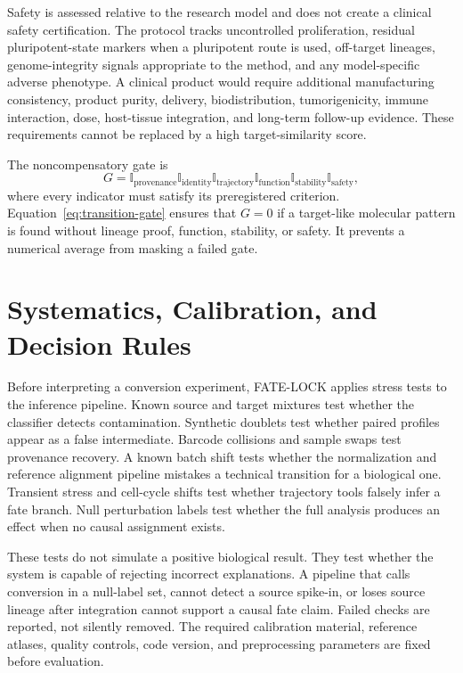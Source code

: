 \documentclass[10pt,conference]{IEEEtran}
\begin{document}
Safety is assessed relative to the research model and does not create a clinical safety certification. The protocol tracks uncontrolled proliferation, residual pluripotent-state markers when a pluripotent route is used, off-target lineages, genome-integrity signals appropriate to the method, and any model-specific adverse phenotype. A clinical product would require additional manufacturing consistency, product purity, delivery, biodistribution, tumorigenicity, immune interaction, dose, host-tissue integration, and long-term follow-up evidence. These requirements cannot be replaced by a high target-similarity score.

The noncompensatory gate is
\begin{equation}
G=\mathbb{I}_{\mathrm{provenance}}\mathbb{I}_{\mathrm{identity}}\mathbb{I}_{\mathrm{trajectory}}\mathbb{I}_{\mathrm{function}}\mathbb{I}_{\mathrm{stability}}\mathbb{I}_{\mathrm{safety}},
\label{eq:transition-gate}
\end{equation}
where every indicator must satisfy its preregistered criterion. Equation~\eqref{eq:transition-gate} ensures that $G=0$ if a target-like molecular pattern is found without lineage proof, function, stability, or safety. It prevents a numerical average from masking a failed gate.

\section{Systematics, Calibration, and Decision Rules}
\label{sec:systematics}

Before interpreting a conversion experiment, FATE-LOCK applies stress tests to the inference pipeline. Known source and target mixtures test whether the classifier detects contamination. Synthetic doublets test whether paired profiles appear as a false intermediate. Barcode collisions and sample swaps test provenance recovery. A known batch shift tests whether the normalization and reference alignment pipeline mistakes a technical transition for a biological one. Transient stress and cell-cycle shifts test whether trajectory tools falsely infer a fate branch. Null perturbation labels test whether the full analysis produces an effect when no causal assignment exists.

These tests do not simulate a positive biological result. They test whether the system is capable of rejecting incorrect explanations. A pipeline that calls conversion in a null-label set, cannot detect a source spike-in, or loses source lineage after integration cannot support a causal fate claim. Failed checks are reported, not silently removed. The required calibration material, reference atlases, quality controls, code version, and preprocessing parameters are fixed before evaluation.
\end{document}
